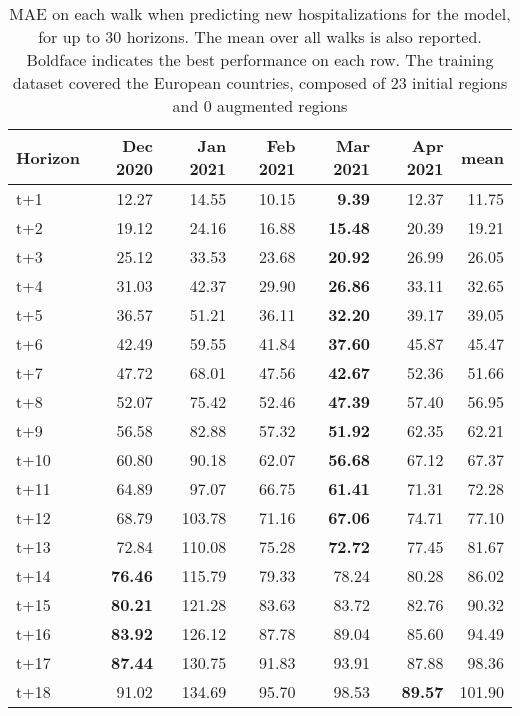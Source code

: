 \begin{table}[H]
\centering
\caption{MAE on each walk when predicting new hospitalizations for the model, for up to 30 horizons. The mean over all walks is also reported. Boldface indicates the best performance on each row. The training dataset covered the European countries, composed of 23 initial regions and 0 augmented regions }
\label{tab:MAE_walk_baseline}
\begin{tabular}{lrrrrrr}
\toprule
Horizon &  Dec 2020 &  Jan 2021 &  Feb 2021 &  Mar 2021 &  Apr 2021 &   mean \\
\midrule
t+1  & 12.27  & 14.55  & 10.15  & \textbf{9.39}  & 12.37  & 11.75  \\
t+2  & 19.12  & 24.16  & 16.88  & \textbf{15.48}  & 20.39  & 19.21  \\
t+3  & 25.12  & 33.53  & 23.68  & \textbf{20.92}  & 26.99  & 26.05  \\
t+4  & 31.03  & 42.37  & 29.90  & \textbf{26.86}  & 33.11  & 32.65  \\
t+5  & 36.57  & 51.21  & 36.11  & \textbf{32.20}  & 39.17  & 39.05  \\
t+6  & 42.49  & 59.55  & 41.84  & \textbf{37.60}  & 45.87  & 45.47  \\
t+7  & 47.72  & 68.01  & 47.56  & \textbf{42.67}  & 52.36  & 51.66  \\
t+8  & 52.07  & 75.42  & 52.46  & \textbf{47.39}  & 57.40  & 56.95  \\
t+9  & 56.58  & 82.88  & 57.32  & \textbf{51.92}  & 62.35  & 62.21  \\
t+10  & 60.80  & 90.18  & 62.07  & \textbf{56.68}  & 67.12  & 67.37  \\
t+11  & 64.89  & 97.07  & 66.75  & \textbf{61.41}  & 71.31  & 72.28  \\
t+12  & 68.79  & 103.78  & 71.16  & \textbf{67.06}  & 74.71  & 77.10  \\
t+13  & 72.84  & 110.08  & 75.28  & \textbf{72.72}  & 77.45  & 81.67  \\
t+14  & \textbf{76.46}  & 115.79  & 79.33  & 78.24  & 80.28  & 86.02  \\
t+15  & \textbf{80.21}  & 121.28  & 83.63  & 83.72  & 82.76  & 90.32  \\
t+16  & \textbf{83.92}  & 126.12  & 87.78  & 89.04  & 85.60  & 94.49  \\
t+17  & \textbf{87.44}  & 130.75  & 91.83  & 93.91  & 87.88  & 98.36  \\
t+18  & 91.02  & 134.69  & 95.70  & 98.53  & \textbf{89.57}  & 101.90  \\

\end{tabular}
\end{table}
